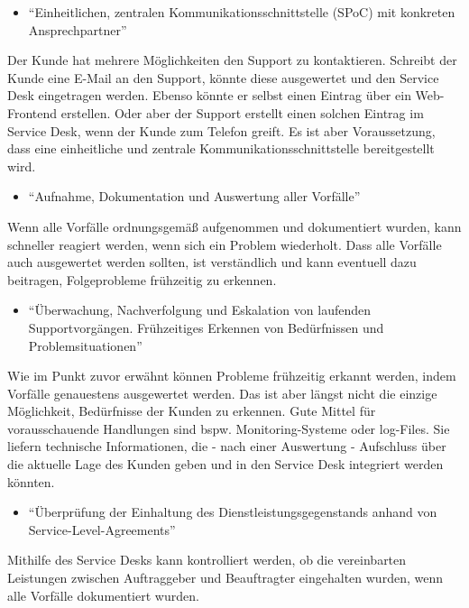 \begin{itemize}
\item \enquote{Einheitlichen, zentralen Kommunikationsschnittstelle (SPoC) mit konkreten Ansprechpartner}
\end{itemize}
\noindent
Der Kunde hat mehrere Möglichkeiten den Support zu kontaktieren. Schreibt der Kunde eine E-Mail an den Support, könnte diese ausgewertet und den Service Desk eingetragen werden. Ebenso könnte er selbst einen Eintrag über ein Web-Frontend erstellen. Oder aber der Support erstellt einen solchen Eintrag im Service Desk, wenn der Kunde zum Telefon greift. Es ist aber Voraussetzung, dass eine einheitliche und zentrale Kommunikationsschnittstelle bereitgestellt wird.


\begin{itemize}
\item \enquote{Aufnahme, Dokumentation und Auswertung aller Vorfälle}
\end{itemize}
\noindent
Wenn alle Vorfälle ordnungsgemäß aufgenommen und dokumentiert wurden, kann schneller reagiert werden, wenn sich ein Problem wiederholt. Dass alle Vorfälle auch ausgewertet werden sollten, ist verständlich und kann eventuell dazu beitragen, Folgeprobleme frühzeitig zu erkennen.

\begin{itemize}
\item \enquote{Überwachung, Nachverfolgung und Eskalation von laufenden
Supportvorgängen. Frühzeitiges Erkennen von
Bedürfnissen und Problemsituationen}
\end{itemize}
\noindent
Wie im Punkt zuvor erwähnt können Probleme frühzeitig erkannt werden, indem Vorfälle genauestens ausgewertet werden. Das ist aber längst nicht die einzige Möglichkeit, Bedürfnisse der Kunden zu erkennen. Gute Mittel für vorausschauende Handlungen sind  bspw. Monitoring-Systeme oder log-Files. Sie liefern technische Informationen, die - nach einer Auswertung - Aufschluss über die aktuelle Lage des Kunden geben und in den Service Desk integriert werden könnten.


\begin{itemize}
\item \enquote{Überprüfung der Einhaltung des Dienstleistungsgegenstands
anhand von Service-Level-Agreements}
\end{itemize}
\noindent
Mithilfe des Service Desks kann kontrolliert werden, ob die vereinbarten Leistungen zwischen Auftraggeber und Beauftragter eingehalten wurden, wenn alle Vorfälle dokumentiert wurden.


